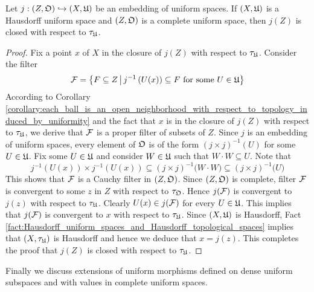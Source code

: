 \begin{theorem}\label{theorem:embeddings_of_complete_space_into_Hausdorff_space_are_closed}
Let $j:\left(Z,{\mathfrak O} \right) \hookrightarrow \left(X,{\mathfrak U}\right)$ be an embedding of uniform spaces. If $\left(X,{\mathfrak U}\right)$ is a Hausdorff uniform space and $\left(Z,{\mathfrak O}\right)$ is a complete uniform space, then $j(Z)$ is closed with respect to $\tau_{{\mathfrak U}}$.
\end{theorem}
\begin{proof}
Fix a point $x$ of $X$ in the closure of $j(Z)$ with respect to $\tau_{{\mathfrak U}}$. Consider the filter
$${\mathcal F} = \big\{F\subseteq Z\,\big|\,j^{-1}\left(U(x)\right)\subseteq F\mbox{ for some }U \in {\mathfrak U}\big\}$$
According to Corollary \ref{corollary:each_ball_is_an_open_neighborhood_with_respect_to_topology_induced_by_uniformity} and the fact that $x$ is in the closure of $j(Z)$ with respect to $\tau_{{\mathfrak U}}$, we derive that ${\mathcal F}$ is a proper filter of subsets of $Z$. Since $j$ is an embedding of uniform spaces, every element of ${\mathfrak O}$ is of the form $\left(j\times j\right)^{-1}(U)$ for some $U \in {\mathfrak U}$. Fix some $U \in {\mathfrak U}$ and consider $W\in {\mathfrak U}$ such that $W\cdot W\subseteq U$. Note that
$$j^{-1}\left(U(x)\right)\times j^{-1}\left(U(x)\right) \subseteq \left(j\times j\right)^{-1}\big(W\cdot W\big) \subseteq \left(j\times j\right)^{-1}\big(U\big)$$
This shows that ${\mathcal F}$ is a Cauchy filter in $\left(Z,{\mathfrak O}\right)$. Since $(Z,{\mathfrak O})$ is complete, filter ${\mathcal F}$ is convergent to some $z$ in $Z$ with respect to $\tau_{{\mathfrak O}}$. Hence $j({\mathcal F})$ is convergent to $j(z)$ with respect to $\tau_{{\mathfrak U}}$. Clearly $U(x) \in j({\mathcal F})$ for every $U \in {\mathfrak U}$. This implies that $j({\mathcal F})$ is convergent to $x$ with respect to $\tau_{{\mathfrak U}}$. Since $\left(X,{\mathfrak U}\right)$ is Hausdorff, Fact \ref{fact:Hausdorff_uniform_spaces_and_Hausdorff_topological_spaces} implies that $(X,\tau_{{\mathfrak U}})$ is Hausdorff and hence we deduce that $x = j(z)$. This completes the proof that $j(Z)$ is closed with respect to $\tau_{{\mathfrak U}}$.
\end{proof}
\noindent
Finally we discuss extensions of uniform morphisms defined on dense uniform subspaces and with values in complete uniform spaces.

